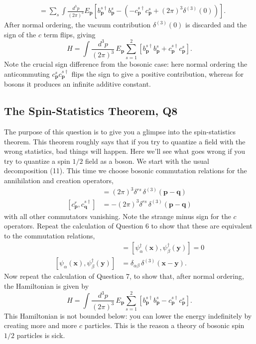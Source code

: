 \begin{solution}
\begin{equation}
\begin{aligned}
        &= \sum_s\int\frac{d^3p}{(2\pi)^3}E_\mathbf{p}\left[b^{s\dagger}_\mathbf{p} b^s_\mathbf{p} - \left(-c^{s\dagger}_\mathbf{p} c^s_\mathbf{p} + (2\pi)^3\delta^{(3)}(0)\right)\right].
    \end{aligned}
    \end{equation}
    After normal ordering, the vacuum contribution $\delta^{(3)}(0)$ is discarded and the sign of the $c$ term flips, giving
    \begin{equation}
        H = \int\frac{d^3p}{(2\pi)^3}\,E_\mathbf{p}\sum_{s=1}^2\left[b^{s\dagger}_\mathbf{p} b^s_\mathbf{p} + c^{s\dagger}_\mathbf{p} c^s_\mathbf{p}\right].
    \end{equation}
    Note the crucial sign difference from the bosonic case: here normal ordering the anticommuting $c^s_\mathbf{p} c^{s\dagger}_\mathbf{p}$ flips the sign to give a positive contribution, whereas for bosons it produces an infinite additive constant.
\end{solution}

\subsection{The Spin-Statistics Theorem, Q8}

The purpose of this question is to give you a glimpse into the spin-statistics theorem. This theorem roughly says that if you try to quantize a field with the wrong statistics, bad things will happen. Here we'll see what goes wrong if you try to quantize a spin $1/2$ field as a boson. We start with the usual decomposition (11). This time we choose bosonic commutation relations for the annihilation and creation operators,
\begin{align}
    [b^r_{\mathbf{p}}, b^{s\dagger}_{\mathbf{q}}] &= (2\pi)^3\delta^{rs}\,\delta^{(3)}(\mathbf{p}-\mathbf{q})\\
    [c^r_{\mathbf{p}}, c^{s\dagger}_{\mathbf{q}}] &= -(2\pi)^3\delta^{rs}\,\delta^{(3)}(\mathbf{p}-\mathbf{q})
\end{align}
with all other commutators vanishing. Note the strange minus sign for the $c$ operators. Repeat the calculation of Question 6 to show that these are equivalent to the commutation relations,
\begin{align}
    [\psi_\alpha(\mathbf{x}), \psi_\beta(\mathbf{y})] &= [\psi^\dagger_\alpha(\mathbf{x}), \psi^\dagger_\beta(\mathbf{y})] = 0\\
    [\psi_\alpha(\mathbf{x}), \psi^\dagger_\beta(\mathbf{y})] &= \delta_{\alpha\beta}\,\delta^{(3)}(\mathbf{x}-\mathbf{y}).
\end{align}
Now repeat the calculation of Question 7, to show that, after normal ordering, the Hamiltonian is given by
\begin{equation}
    H = \int\frac{d^3p}{(2\pi)^3}\,E_{\mathbf{p}}\sum_{s=1}^{2}\left[b^{s\dagger}_{\mathbf{p}}b^s_{\mathbf{p}} - c^{s\dagger}_{\mathbf{p}}c^s_{\mathbf{p}}\right].
\end{equation}
This Hamiltonian is not bounded below: you can lower the energy indefinitely by creating more and more $c$ particles. This is the reason a theory of bosonic spin $1/2$ particles is sick.

